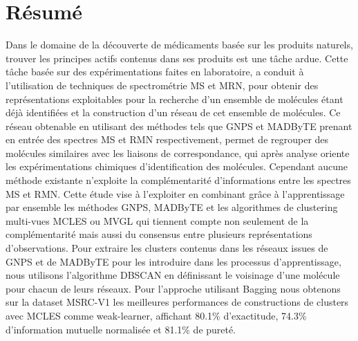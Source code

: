 \chapter*{R\'esum\'e}


Dans le domaine de la découverte de médicaments basée sur les produits naturels, trouver les principes actifs contenus dans ses produits est une tâche ardue.
Cette tâche basée sur des expérimentations faites en laboratoire, a conduit à l'utilisation de techniques de spectrométrie MS et MRN, pour obtenir des représentations exploitables pour la recherche d'un ensemble de molécules étant déjà identifiées et la construction d'un réseau de cet ensemble de molécules.
Ce réseau obtenable en utilisant des méthodes tels que GNPS et MADByTE prenant en entrée des spectres MS et RMN respectivement, permet de regrouper des molécules similaires avec les liaisons de correspondance, qui après analyse oriente les expérimentations chimiques d'identification des molécules.
Cependant aucune méthode existante n'exploite la complémentarité d'informations entre les spectres MS et RMN.
Cette étude vise à l'exploiter en combinant grâce à l'apprentissage par ensemble les méthodes GNPS, MADByTE et les algorithmes de clustering multi-vues MCLES ou MVGL qui tiennent compte non seulement de la complémentarité mais aussi du consensus entre plusieurs représentations d’observations.
Pour extraire les clusters contenus dans les réseaux issues de GNPS et de MADByTE pour les introduire dans les processus d’apprentissage, nous utilisons l'algorithme DBSCAN en définissant le voisinage d'une molécule pour chacun de leurs réseaux.
Pour l'approche utilisant Bagging nous obtenons sur la dataset MSRC-V1 les meilleures performances de constructions de clusters avec MCLES comme weak-learner, affichant 80.1\% d'exactitude, 74.3\% d'information mutuelle normalisée et 81.1\% de pureté.



\justify
